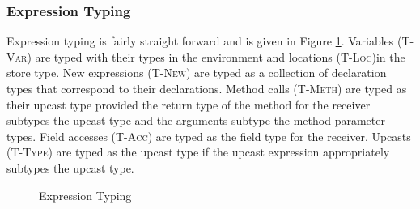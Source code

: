 \documentclass{llncs}
\numberwithin{subcase}{casethm}
\numberwithin{casethm}{theorem}
\numberwithin{casethm}{lemma}
\begin{document}
\subsubsection{Expression Typing}
Expression typing is fairly straight forward and is 
given in Figure \ref{f:e_typ}. Variables (\textsc{T-Var})
are typed with their types in the environment and 
locations (\textsc{T-Loc})in the store type. New 
expressions (\textsc{T-New}) are typed as a collection 
of declaration types that correspond to their declarations. 
Method calls (\textsc{T-Meth}) are typed as their 
upcast type provided the return type of the method for 
the receiver subtypes the upcast type and the arguments 
subtype the method parameter types. Field accesses 
(\textsc{T-Acc}) are typed as the field type for the receiver. 
Upcasts (\textsc{T-Type}) are typed as the upcast type if the 
upcast expression appropriately subtypes the upcast type.


\begin{figure}[h]
\hfill {}
\caption{Expression Typing}
\label{f:e_typ}
\end{figure}
\end{document}
